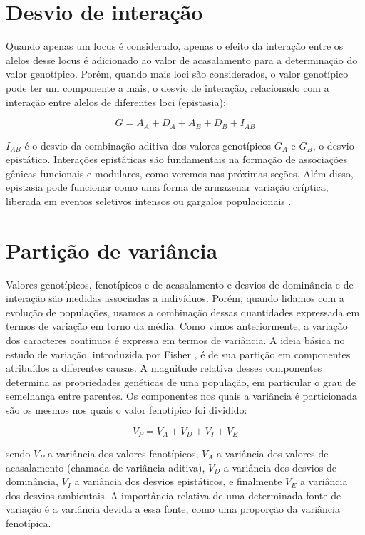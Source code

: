 \documentclass[portuges,]{tufte-handout}
\begin{document}
\section{Desvio de interação}\label{desvio-de-interauxe7uxe3o}

Quando apenas um locus é considerado, apenas o efeito da interação entre
os alelos desse locus é adicionado ao valor de acasalamento para a
determinação do valor genotípico. Porém, quando mais loci são
considerados, o valor genotípico pode ter um componente a mais, o desvio
de interação, relacionado com a interação entre alelos de diferentes
loci (epistasia):

\[
G = A_A + D_A + A_B + D_B + I_{AB}
\]

\(I_{AB}\) é o desvio da combinação aditiva dos valores genotípicos
\(G_A\) e \(G_B\), o desvio epistático. Interações epistáticas são
fundamentais na formação de associações gênicas funcionais e modulares,
como veremos nas próximas seções. Além disso, epistasia pode funcionar
como uma forma de armazenar variação críptica, liberada em eventos
seletivos intensos ou gargalos populacionais \cite{Cheverud1996a}.

\section{Partição de variância}\label{partiuxe7uxe3o-de-variuxe2ncia}

Valores genotípicos, fenotípicos e de acasalamento e desvios de
dominância e de interação são medidas associadas a indivíduos. Porém,
quando lidamos com a evolução de populações, usamos a combinação dessas
quantidades expressada em termos de variação em torno da média. Como
vimos anteriormente, a variação dos caracteres contínuos é expressa em
termos de variância. A ideia básica no estudo de variação, introduzida
por Fisher \cite{Fisher1918}, é de sua partição em componentes
atribuídos a diferentes causas. A magnitude relativa desses componentes
determina as propriedades genéticas de uma população, em particular o
grau de semelhança entre parentes. Os componentes nos quais a variância
é particionada são os mesmos nos quais o valor fenotípico foi dividido:

\[
V_P = V_A + V_D + V_I + V_E
\]

sendo \(V_P\) a variância dos valores fenotípicos, \(V_A\) a variância
dos valores de acasalamento (chamada de variância aditiva), \(V_D\) a
variância dos desvios de dominância, \(V_I\) a variância dos desvios
epistáticos, e finalmente \(V_E\) a variância dos desvios ambientais. A
importância relativa de uma determinada fonte de variação é a variância
devida a essa fonte, como uma proporção da variância fenotípica.
\end{document}
